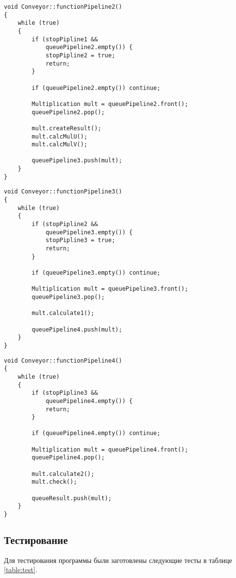 \begin{lstlisting}[caption=Второй конвейер,label=lst:pipeline2]
void Conveyor::functionPipeline2()
{
    while (true)
    {
        if (stopPipline1 &&
            queuePipeline2.empty()) {
            stopPipline2 = true;
            return;
        }

        if (queuePipeline2.empty()) continue;

        Multiplication mult = queuePipeline2.front();
        queuePipeline2.pop();

        mult.createResult();
        mult.calcMulU();
        mult.calcMulV();

        queuePipeline3.push(mult);
    }
}
\end{lstlisting}

\begin{lstlisting}[caption=Третий конвейер,label=lst:pipeline3]
void Conveyor::functionPipeline3()
{
    while (true)
    {
        if (stopPipline2 &&
            queuePipeline3.empty()) {
            stopPipline3 = true;
            return;
        }

        if (queuePipeline3.empty()) continue;

        Multiplication mult = queuePipeline3.front();
        queuePipeline3.pop();

        mult.calculate1();

        queuePipeline4.push(mult);
    }
}
\end{lstlisting}

\begin{lstlisting}[caption=Четвертый конвейер,label=lst:pipeline4]
void Conveyor::functionPipeline4()
{
    while (true)
    {
        if (stopPipline3 &&
            queuePipeline4.empty()) {
            return;
        }

        if (queuePipeline4.empty()) continue;

        Multiplication mult = queuePipeline4.front();
        queuePipeline4.pop();

        mult.calculate2();
        mult.check();

        queueResult.push(mult);
    }
}
\end{lstlisting}

\subsection{Тестирование}

Для тестирования программы были заготовлены следующие тесты в таблице
\ref{table:test}.

